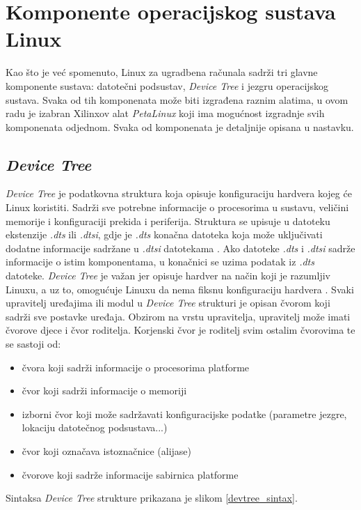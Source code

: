 \documentclass[times, utf8, diplomski, numeric]{fer}
\begin{document}
\section{Komponente operacijskog sustava Linux}
Kao što je već spomenuto, Linux za ugradbena računala sadrži tri glavne komponente sustava: datotečni podsustav, \textit{Device
Tree} i jezgru operacijskog sustava. Svaka od tih komponenata može biti izgrađena raznim alatima, u ovom radu je izabran
Xilinxov alat \textit{PetaLinux} koji ima mogućnost izgradnje svih komponenata odjednom. Svaka od komponenata je detaljnije
opisana u nastavku.

\subsection{\textit{Device Tree}}
\textit{Device Tree} je podatkovna struktura koja opisuje konfiguraciju hardvera kojeg će Linux koristiti. Sadrži sve potrebne
informacije o procesorima u sustavu, veličini memorije i konfiguraciji prekida i periferija. Struktura se upisuje u datoteku
ekstenzije \textit{.dts} ili \textit{.dtsi}, gdje je \textit{.dts} konačna datoteka koja može uključivati dodatne informacije
sadržane u \textit{.dtsi} datotekama \cite{xlnx}. Ako datoteke \textit{.dts} i \textit{.dtsi} sadrže informacije o istim komponentama,
u konačnici se uzima podatak iz \textit{.dts} datoteke. \textit{Device Tree} je važan jer opisuje hardver na način koji je
razumljiv Linuxu, a uz to, omogućuje Linuxu da nema fiksnu konfiguraciju hardvera \cite{plnx}. Svaki upravitelj uređajima ili modul
u \textit{Device Tree} strukturi je opisan čvorom koji sadrži sve postavke uređaja. Obzirom na vrstu upravitelja, upravitelj
može imati čvorove djece i čvor roditelja. Korjenski čvor je roditelj svim ostalim čvorovima te se sastoji od:
\begin{itemize}
  \item{čvora koji sadrži informacije o procesorima platforme}
  \item{čvor koji sadrži informacije o memoriji}
  \item{izborni čvor koji može sadržavati konfiguracijske podatke (parametre jezgre, lokaciju datotečnog podsustava...)}
  \item{čvor koji označava istoznačnice (alijase)}
  \item{čvorove koji sadrže informacije sabirnica platforme}
\end{itemize}
Sintaksa \textit{Device Tree} strukture prikazana je slikom \ref{devtree_sintax}.
\end{document}
